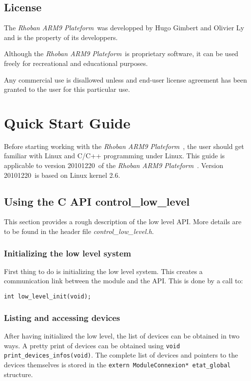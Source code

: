 \documentclass[a4paper]{article}
\newcommand{\rhobanp}{\emph{Rhoban ARM9 Plateform}\ }
\newcommand{\version}{20101220\ }
\newcommand{\instruction}[1]{{\tt #1}}
\newcommand{\file}[1]{\emph{#1}}
\begin{document}
\subsection{License}

The \rhobanp was developped by Hugo Gimbert and Olivier Ly
and is the property of its developpers.

Although the \rhobanp is proprietary software, it can be used
freely for recreational and educational purposes.

Any commercial use is disallowed unless and end-user license agreement
has been granted to the user for this particular use.

\section{Quick Start Guide}

Before starting working with the \rhobanp, the user should get familiar with
Linux and C/C++ programming under Linux. This guide is applicable to
version \version of the \rhobanp.
Version \version is based on Linux kernel 2.6.


\subsection{Using the C API control\_low\_level}

This section provides a rough description of the low level API.
More details are to be found in the header file \file{control\_low\_level.h}.

\subsubsection{Initializing the low level system}

First thing to do is initializing the low level system.
This creates a communication link between the module
and the API.
This is done by a call to:

\instruction{int low\_level\_init(void);}

\subsubsection{Listing and accessing devices}

After having initialized the low level,
the list of devices can be obtained in
two ways. A pretty print of devices can be obtained using
\instruction{void print\_devices\_infos(void)}.
The complete list of devices and pointers to the devices themselves
is stored in the \instruction{extern ModuleConnexion* etat\_global} structure.
\end{document}
